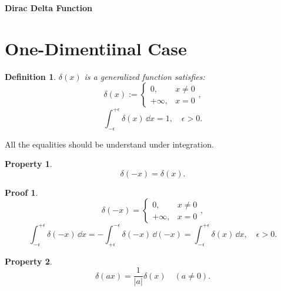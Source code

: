 \documentclass{article}
\theoremstyle{1}
\newtheorem{definition}{Definition}
\newtheorem{property}{Property}
\theoremstyle{2}
\newtheorem*{proof_env}{Proof}
\begin{document}
\begin{center}
    \huge{\textbf{Dirac Delta Function}}
\end{center}
\section{One-Dimentiinal Case}
\begin{definition}
    $\delta(x)$ is a generalized function satisfies:
    \begin{equation}
        \delta(x):=\left\{\begin{matrix}
            0,&x\not=0\\
            +\infty,&x=0
        \end{matrix} \right. ,
    \end{equation}
    \begin{equation}
        \int_{-\epsilon}^{+\epsilon}\delta(x)\, \dd x=1,\quad\epsilon>0.
    \end{equation}
    
\end{definition}
All the equalities should be understand under integration.
\begin{property}
        \begin{equation}\label{3}
            \delta(-x)=\delta(x).
        \end{equation}
\end{property}
\begin{proof_env}
    \begin{equation}
        \delta(-x)=\left\{\begin{matrix}
           0,&x\not=0\\
            +\infty,&x=0 
        \end{matrix}\right. ,
    \end{equation}
    \begin{equation}
       \int_{-\epsilon}^{+\epsilon}\delta(-x)\, \dd x=-\int_{+\epsilon}^{-\epsilon}\delta(-x)\, \dd (-x)=\int_{-\epsilon}^{+\epsilon}\delta(x)\, \dd x,\quad\epsilon>0.
    \end{equation}
\end{proof_env}
\begin{property}\label{p2}
    \begin{equation}
            \delta(ax)=\frac{1}{\left|a\right|}\delta(x)\quad (a\not=0).
    \end{equation}
\end{property}
\end{document}
